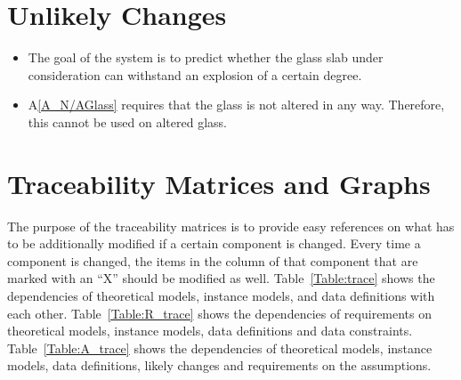 \documentclass[12pt]{article}
\newcommand{\aref}[1]{A\ref{#1}}
\newcounter{ucnum} %
\newcommand{\utheucnum}{UC\theucnum}
\begin{document}
\section{Unlikely Changes} \label{sec_unlike}

\noindent \begin{itemize}

\item[\refstepcounter{ucnum} \utheucnum \label{ucGoal}:] The goal of the system
  is to predict whether the glass slab under consideration can withstand an 
  explosion of a certain degree.
\item[\refstepcounter{ucnum} \utheucnum \label{ucN/AGlass}:] \aref{A_N/AGlass} requires that the glass is not altered in any way. Therefore, this cannot be used on altered glass.

\end{itemize}

\section{Traceability Matrices and Graphs}
The purpose of the traceability matrices is to provide easy references on what 
has to be additionally modified if a certain component is changed.  Every time a 
component is changed, the items in the column of that component that are 
marked with an ``X'' should be modified as well.  Table~\ref{Table:trace}
shows the dependencies of theoretical models, instance models, and data 
definitions with each other. Table~\ref{Table:R_trace} shows the dependencies of 
requirements on theoretical models, instance models, data definitions and 
data constraints. Table~\ref{Table:A_trace} shows the dependencies 
of theoretical models, instance models, data definitions, likely changes and 
requirements on the assumptions.
\newline
\end{document}
